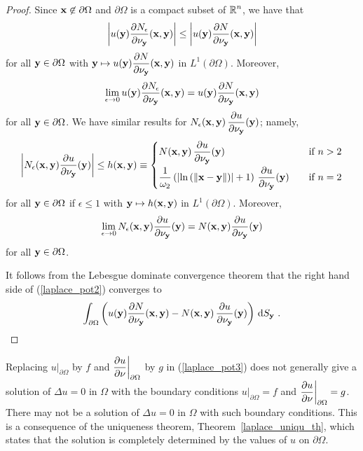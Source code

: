 \begin{proof}
Since $\mathbf{x} \not\in \partial \Omega$ and $\partial \Omega$ is a
compact subset of $\displaystyle \mathbb{R}^n$, we have that
\[
\left| u(\mathbf{y})
\frac{\partial{N_{\epsilon}}}{\partial \mathbf{\nu}_{\mathbf{y}}}(\mathbf{x},\mathbf{y}) \right|
\leq \left| u(\mathbf{y}) \frac{\partial{N}}{\partial \mathbf{\nu}_{\mathbf{y}}}(\mathbf{x},\mathbf{y}) \right|
\]
for all $\mathbf{y} \in \partial \Omega$ with
$\displaystyle \mathbf{y}\mapsto u(\mathbf{y})
\frac{\partial{N}}{\partial \mathbf{\nu}_{\mathbf{y}}}(\mathbf{x},\mathbf{y})$ in
$\displaystyle L^1(\partial \Omega)$.
Moreover,
\[
\lim_{\epsilon \rightarrow 0}
u(\mathbf{y}) \frac{\partial{N_{\epsilon}}}{\partial \mathbf{\nu}_{\mathbf{y}}}(\mathbf{x},\mathbf{y})
= u(\mathbf{y}) \frac{\partial{N}}{\partial \mathbf{\nu}_{\mathbf{y}}}(\mathbf{x},\mathbf{y})
\]
for all $\mathbf{y} \in \partial \Omega$.  We have similar results for 
$\displaystyle N_{\epsilon}(\mathbf{x},\mathbf{y})
\, \frac{\partial{u}}{\partial \mathbf{\nu}_{\mathbf{y}}}(\mathbf{y})$; namely,
\[
\left| N_{\epsilon}(\mathbf{x},\mathbf{y})
\frac{\partial{u}}{\partial \mathbf{\nu}_{\mathbf{y}}}(\mathbf{y}) \right|
\leq h(\mathbf{x},\mathbf{y})
\equiv
\begin{cases}
\displaystyle N(\mathbf{x},\mathbf{y})
\, \frac{\partial{u}}{\partial \mathbf{\nu}_{\mathbf{y}}}(\mathbf{y}) & \quad \text{if} \ n > 2 \\[0.8em]
\displaystyle
\frac{1}{\omega_2} \left( \left|\ln\left(\|\mathbf{x}- \mathbf{y}\|\right)\right|
+1 \right) \, \frac{\partial{u}}{\partial \mathbf{\nu}_{\mathbf{y}}}(\mathbf{y}) & \quad
\text{if} \ n = 2
\end{cases}
\]
for all $\mathbf{y} \in \partial \Omega$ if $\epsilon \leq 1$ with
$\displaystyle \mathbf{y}\mapsto h(\mathbf{x},\mathbf{y})$ in
$\displaystyle L^1(\partial \Omega)$.
Moreover,
\[
\lim_{\epsilon \rightarrow 0}
N_{\epsilon}(\mathbf{x},\mathbf{y})
\frac{\partial{u}}{\partial \mathbf{\nu}_{\mathbf{y}}}(\mathbf{y})
= N(\mathbf{x},\mathbf{y})
\frac{\partial{u}}{\partial \mathbf{\nu}_{\mathbf{y}}}(\mathbf{y})
\]
for all $\mathbf{y} \in \partial \Omega$.

It follows from the Lebesgue dominate convergence theorem that the
right hand side of (\ref{laplace_pot2}) converges to
\[
\int_{\partial \Omega} \left( u(\VEC{y})
\pdydx{N}{\VEC{\nu}_{\VEC{y}}}(\VEC{x},\VEC{y}) - N(\VEC{x},\VEC{y}) \,
\pdydx{u}{\VEC{\nu}_{\VEC{y}}}(\VEC{y})\right) \dss{S}{y} \ .
\]
\end{proof}

\begin{rmk}
Replacing $\displaystyle u\big|_{\partial \Omega}$ by $f$ and
$\displaystyle \frac{\partial{u}}{\partial \mathbf{\nu}}\bigg|_{\partial \Omega}$ by $g$
in (\ref{laplace_pot3}) does not generally give a solution of
$\Delta u = 0$ in $\Omega$ with the boundary conditions
$\displaystyle u\big|_{\partial \Omega} = f$ and
$\displaystyle \frac{\partial{u}}{\partial \mathbf{\nu}}\bigg|_{\partial \Omega} = g$.
There may not be a solution of $\Delta u = 0$ in $\Omega$ with such
boundary conditions.  This is a consequence of the uniqueness theorem,
Theorem~\ref{laplace_uniqu_th}, which states that the solution is
completely determined by the values of $u$ on $\partial \Omega$.
\end{rmk}

